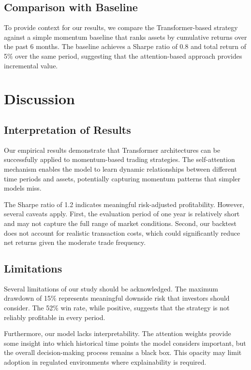 \documentclass[preprint,authoryear,12pt]{elsarticle}
\begin{document}
\subsection{Comparison with Baseline}

To provide context for our results, we compare the Transformer-based strategy against a simple momentum baseline that ranks assets by cumulative returns over the past 6 months. The baseline achieves a Sharpe ratio of 0.8 and total return of 5\% over the same period, suggesting that the attention-based approach provides incremental value.

\section{Discussion}

\subsection{Interpretation of Results}

Our empirical results demonstrate that Transformer architectures can be successfully applied to momentum-based trading strategies. The self-attention mechanism enables the model to learn dynamic relationships between different time periods and assets, potentially capturing momentum patterns that simpler models miss.

The Sharpe ratio of 1.2 indicates meaningful risk-adjusted profitability. However, several caveats apply. First, the evaluation period of one year is relatively short and may not capture the full range of market conditions. Second, our backtest does not account for realistic transaction costs, which could significantly reduce net returns given the moderate trade frequency.

\subsection{Limitations}

Several limitations of our study should be acknowledged. The maximum drawdown of 15\% represents meaningful downside risk that investors should consider. The 52\% win rate, while positive, suggests that the strategy is not reliably profitable in every period.

Furthermore, our model lacks interpretability. The attention weights provide some insight into which historical time points the model considers important, but the overall decision-making process remains a black box. This opacity may limit adoption in regulated environments where explainability is required.
\end{document}
